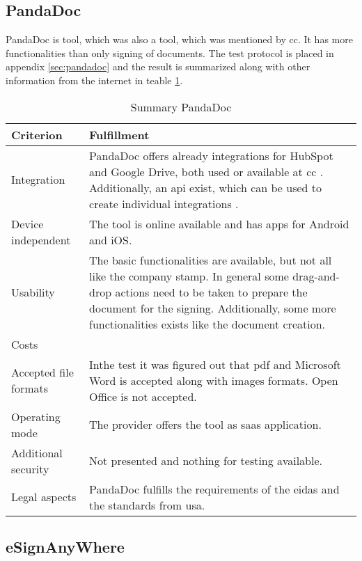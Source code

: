 \subsection{PandaDoc}
PandaDoc is tool, which was also a tool, which was mentioned by \gls{cc}. It has more functionalities than only signing of documents. The test protocol is placed in appendix \ref{sec:pandadoc} and the result is summarized along with other information from the internet in teable \ref{tab:pandadoc}. 
\begin{table}[h!]
	\begin{tabular}{|p{4cm}|p{10cm}|} \hline
		Criterion & Fulfillment \\ \hline
		Integration & PandaDoc offers already integrations for HubSpot and Google Drive, both used or available at \gls{cc} \parencite{pandadoc2018integration}. Additionally, an \gls{api} exist, which can be used to create individual integrations \parencite{pandadoc2018api}. \\ \hline
		Device independent & The tool is online available and has \glspl{app} for Android and iOS. \\ \hline
		Usability & The basic functionalities are available, but not all like the company stamp. In general some drag-and-drop actions need to be taken to prepare the document for the signing. Additionally, some more functionalities exists like the document creation.\\ \hline
		Costs & \\ \hline
		Accepted file formats & Inthe test it was figured out that \gls{pdf} and Microsoft Word is accepted along with images formats. Open Office is not accepted. \\ \hline
		Operating mode & The provider offers the tool as \gls{saas} application. \parencite{pandadoc2018saas} \\ \hline
		Additional security & Not presented and nothing for testing available. \\ \hline
		Legal aspects & PandaDoc fulfills the requirements of the \gls{eidas} and the standards from \gls{usa}. \parencite{pandadoc2018saas} \\ \hline
	\end{tabular}
	\caption{Summary PandaDoc}
	\label{tab:pandadoc}
\end{table}

\subsection{eSignAnyWhere}


